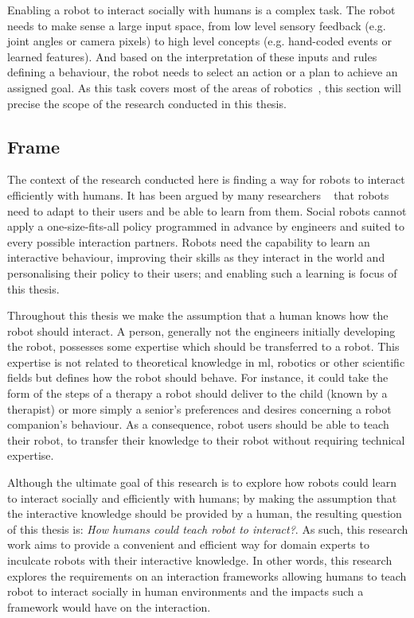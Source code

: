 

Enabling a robot to interact socially with humans is a complex task. The robot needs to make sense a large input space, from low level sensory feedback (e.g. joint angles or camera pixels) to high level concepts (e.g. hand-coded events or learned features). And based on the interpretation of these inputs and rules defining a behaviour, the robot needs to select an action or a plan to achieve an assigned goal. As this task covers most of the areas of robotics~\citep{fong2003survey}, this section will precise the scope of the research conducted in this thesis.

\subsection{Frame}

The context of the research conducted here is finding a way for robots to interact efficiently with humans. It has been argued by many researchers ~\citep{dautenhahn2004robots,billard2008robot} that robots need to adapt to their users and be able to learn from them. Social robots cannot apply a one-size-fits-all policy programmed in advance by engineers and suited to every possible interaction partners. Robots need the capability to learn an interactive behaviour, improving their skills as they interact in the world and personalising their policy to their users; and enabling such a learning is focus of this thesis.

Throughout this thesis we make the assumption that a human knows how the robot should interact. A person, generally not the engineers initially developing the robot, possesses some expertise which should be transferred to a robot. This expertise is not related to theoretical knowledge in \gls{ml}, robotics or other scientific fields but defines how the robot should behave. For instance,  it could take the form of the steps of a therapy a robot should deliver to the child (known by a therapist) or more simply a senior's preferences and desires concerning a robot companion's behaviour. As a consequence, robot users should be able to teach their robot, to transfer their knowledge to their robot without requiring technical expertise.

Although the ultimate goal of this research is to explore how robots could learn to interact socially and efficiently with humans; by making the assumption that the interactive knowledge should be provided by a human, the resulting question of this thesis is: \emph{How humans could teach robot to interact?}. As such, this research work aims to provide a convenient and efficient way for domain experts to inculcate robots with their interactive knowledge. In other words, this research explores the requirements on an interaction frameworks allowing humans to teach robot to interact socially in human environments and the impacts such a framework would have on the interaction.

